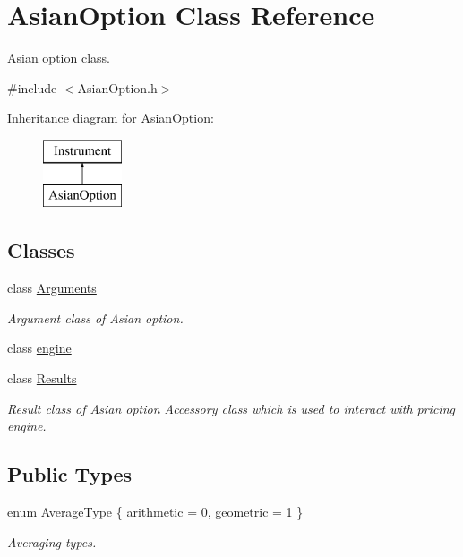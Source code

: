 \hypertarget{class_asian_option}{}\section{Asian\+Option Class Reference}
\label{class_asian_option}


Asian option class.  




{\ttfamily \#include $<$Asian\+Option.\+h$>$}

Inheritance diagram for Asian\+Option\+:\begin{figure}[H]
\begin{center}
\leavevmode
\includegraphics[height=2.000000cm]{class_asian_option}
\end{center}
\end{figure}
\subsection*{Classes}
\begin{DoxyCompactItemize}
\item 
class \hyperlink{class_asian_option_1_1_arguments}{Arguments}
\begin{DoxyCompactList}\small\item\em Argument class of Asian option. \end{DoxyCompactList}\item 
class \hyperlink{class_asian_option_1_1engine}{engine}
\item 
class \hyperlink{class_asian_option_1_1_results}{Results}
\begin{DoxyCompactList}\small\item\em Result class of Asian option Accessory class which is used to interact with pricing engine. \end{DoxyCompactList}\end{DoxyCompactItemize}
\subsection*{Public Types}
\begin{DoxyCompactItemize}
\item 
enum \hyperlink{class_asian_option_add7292791bf85820ff9fdbfd4407f3b9}{Average\+Type} \{ \hyperlink{class_asian_option_add7292791bf85820ff9fdbfd4407f3b9aff8fffb81d05144807269caa96d3b145}{arithmetic} = 0, 
\hyperlink{class_asian_option_add7292791bf85820ff9fdbfd4407f3b9a17b74dba78a6e25158da4eb685ecfa4e}{geometric} = 1
 \}\begin{DoxyCompactList}\small\item\em Averaging types. \end{DoxyCompactList}
\end{DoxyCompactItemize}
